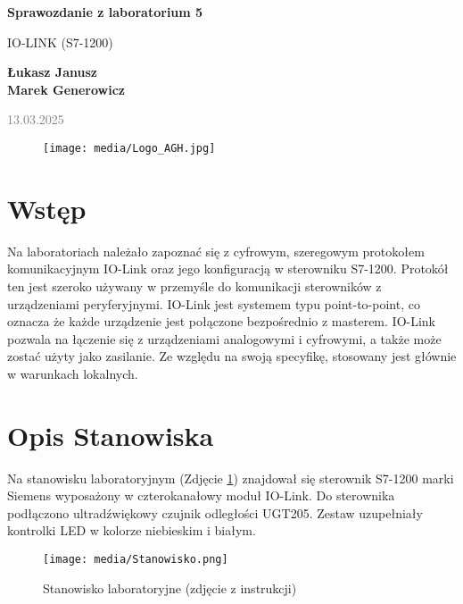 \documentclass{article}
\begin{document}
\begin{titlepage}
    \begin{center}
        \vspace*{1cm}
            
        \Huge
        \textbf{Sprawozdanie z laboratorium 5}
            
        \vspace{0.5cm}
        \LARGE
        IO-LINK (S7-1200) 
            
        \vspace{1.5cm}
            
        \textbf{Łukasz Janusz\\Marek Generowicz}

        \normalsize      
        \textcolor{gray}{13.03.2025}
        \vfill
        \begin{figure}[hb]
            \centering
            \texttt{[image: media/Logo\_AGH.jpg]}
        \end{figure}   
    \end{center}
\end{titlepage}

\section{Wstęp}
Na laboratoriach należało zapoznać się z cyfrowym, szeregowym protokołem komunikacyjnym IO-Link oraz jego konfiguracją w sterowniku S7-1200. Protokół ten jest szeroko używany w przemyśle do komunikacji sterowników z urządzeniami peryferyjnymi. IO-Link jest systemem typu point-to-point, co oznacza że każde urządzenie jest połączone bezpośrednio z masterem. IO-Link pozwala na łączenie się z urządzeniami analogowymi i cyfrowymi, a także może zostać użyty jako zasilanie. Ze względu na swoją specyfikę, stosowany jest głównie w warunkach lokalnych. 

\section{Opis Stanowiska}
Na stanowisku laboratoryjnym (Zdjęcie \ref{fig:stanowisko}) znajdował się sterownik S7-1200 marki Siemens wyposażony w czterokanałowy moduł IO-Link. Do sterownika podłączono ultradźwiękowy czujnik odległości UGT205. Zestaw uzupełniały kontrolki LED w kolorze niebieskim i białym. 

\begin{figure}[H]
    \centering
    \texttt{[image: media/Stanowisko.png]}
    \caption{Stanowisko laboratoryjne (zdjęcie z instrukcji)}
    \label{fig:stanowisko}
\end{figure}
\end{document}
